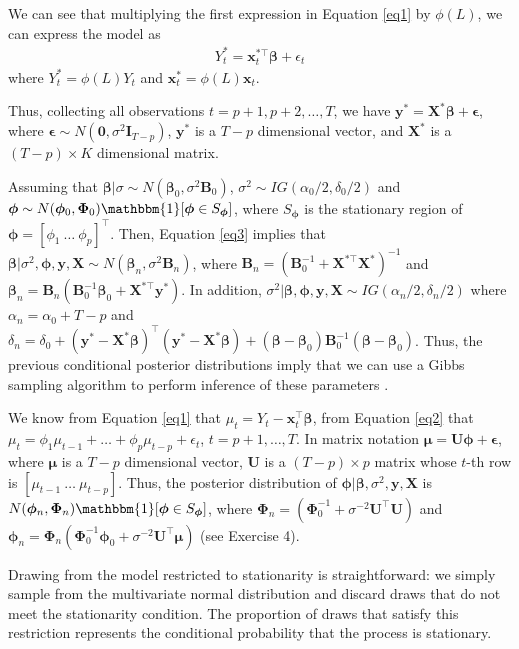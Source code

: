 We can see that multiplying the first expression in Equation \ref{eq1} by $\phi(L)$, we can express the model as 
\begin{align}\label{eq3}
	Y_t^*=\bm{x}_t^{*\top}\bm{\beta}+\epsilon_t
\end{align}
where $Y_t^*=\phi(L)Y_t$ and $\bm{x}_t^{*}=\phi(L)\bm{x}_t$.

Thus, collecting all observations $t=p+1,p+2,\dots,T$, we have $\bm{y}^*=\bm{X}^*\bm{\beta}+\bm{\epsilon}$, where $\bm{\epsilon}\sim N(\bm{0},\sigma^2\bm{I}_{T-p})$, $\bm{y}^*$ is a $T-p$ dimensional vector, and $\bm{X}^*$ is a $(T-p)\times K$ dimensional matrix.

Assuming that $\bm{\beta}|\sigma\sim N(\bm{\beta}_0,\sigma^2\bm{B}_0)$, $\sigma^2\sim IG(\alpha_0/2,\delta_0/2)$ and $\bm{\phi}\sim N(\bm{\phi}_0,\bm{\Phi}_0)\mathbbm{1}[\bm{\phi}\in S_{\bm{\phi}}]$, where $S_{\bm{\phi}}$ is the stationary region of $\bm{\phi}=[\phi_1 \ \dots \ \phi_p]^{\top}$. Then, Equation \ref{eq3} implies that $\bm{\beta}|\sigma^2,\bm{\phi},\bm{y},\bm{X}\sim N(\bm{\beta}_n, \sigma^2{\bm{B}}_n)$, where $\bm{B}_n = (\bm{B}_0^{-1} + \bm{X}^{*\top}\bm{X}^{*})^{-1}$ and $\bm{\beta}_n = \bm{B}_n(\bm{B}_0^{-1}\bm{\beta}_0 + \bm{X}^{*\top}\bm{y}^{*})$. In addition, $\sigma^2|\bm{\beta},\bm{\phi},\bm{y},\bm{X}\sim IG(\alpha_n/2,\delta_n/2)$ where $\alpha_n=\alpha_0+T-p$ and $\delta_n=\delta_0+(\bm{y}^*-\bm{X}^{*}\bm{\beta})^{\top}(\bm{y}^*-\bm{X}^{*}\bm{\beta})+(\bm{\beta}-\bm{\beta}_0)\bm{B}_0^{-1}(\bm{\beta}-\bm{\beta}_0)$. Thus, the previous conditional posterior distributions imply that we can use a Gibbs sampling algorithm to perform inference of these parameters \cite{chib1993bayes}.

We know from Equation \ref{eq1} that $\mu_t=Y_t-\bm{x}_t^{\top}\bm{\beta}$, from Equation \ref{eq2} that $\mu_t=\phi_1\mu_{t-1}+\dots+\phi_p\mu_{t-p}+\epsilon_t$, $t=p+1,\dots,T$. In matrix notation $\bm{\mu}=\bm{U}\bm{\phi}+\bm{\epsilon}$, where $\bm{\mu}$ is a $T-p$ dimensional vector, $\bm{U}$ is a $(T-p)\times p$ matrix whose $t$-th row is $[\mu_{t-1} \ \dots \ \mu_{t-p}]$. Thus, the posterior distribution of $\bm{\phi}|\bm{\beta},\sigma^2,\bm{y},\bm{X}$ is $N(\bm{\phi}_n, \bm{\Phi}_n)\mathbbm{1}[\bm{\phi}\in S_{\bm{\phi}}]$, where $\bm{\Phi}_n=(\bm{\Phi}_0^{-1}+\sigma^{-2}\bm{U}^{\top}\bm{U})$ and $\bm{\phi}_n=\bm{\Phi}_n(\bm{\Phi}_0^{-1}\bm{\phi}_0+\sigma^{-2}\bm{U}^{\top}\bm{\mu})$ (see Exercise 4).

Drawing from the model restricted to stationarity is straightforward: we simply sample from the multivariate normal distribution and discard draws that do not meet the stationarity condition. The proportion of draws that satisfy this restriction represents the conditional probability that the process is stationary.\\

